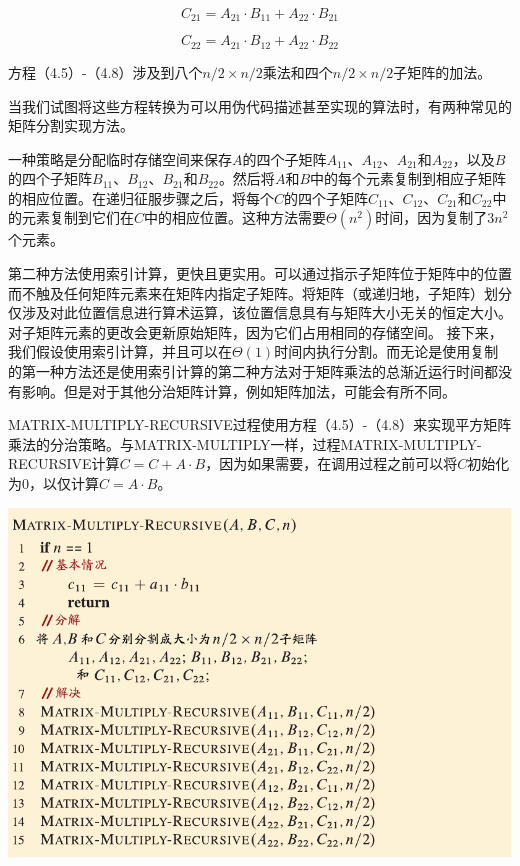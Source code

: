 \documentclass[lang=cn,newtx,10pt,scheme=chinese]{elegantbook}
\begin{document}
\begin{equation}
C_{21}=A_{21} \cdot B_{11}+A_{22} \cdot B_{21}
\end{equation}

\begin{equation}
C_{22}=A_{21} \cdot B_{12}+A_{22} \cdot B_{22}
\end{equation}

方程（4.5）-（4.8）涉及到八个$n / 2 \times n / 2$乘法和四个$n / 2 \times n / 2$子矩阵的加法。

当我们试图将这些方程转换为可以用伪代码描述甚至实现的算法时，有两种常见的矩阵分割实现方法。

一种策略是分配临时存储空间来保存$A$的四个子矩阵$A_{11}$、$A_{12}$、$A_{21}$和$A_{22}$，以及$B$的四个子矩阵$B_{11}$、$B_{12}$、$B_{21}$和$B_{22}$。然后将$A$和$B$中的每个元素复制到相应子矩阵的相应位置。在递归征服步骤之后，将每个$C$的四个子矩阵$C_{11}$、$C_{12}$、$C_{21}$和$C_{22}$中的元素复制到它们在$C$中的相应位置。这种方法需要$\Theta(n^2)$时间，因为复制了$3n^2$个元素。

第二种方法使用索引计算，更快且更实用。可以通过指示子矩阵位于矩阵中的位置而不触及任何矩阵元素来在矩阵内指定子矩阵。将矩阵（或递归地，子矩阵）划分仅涉及对此位置信息进行算术运算，该位置信息具有与矩阵大小无关的恒定大小。对子矩阵元素的更改会更新原始矩阵，因为它们占用相同的存储空间。
接下来，我们假设使用索引计算，并且可以在$\Theta(1)$时间内执行分割。而无论是使用复制的第一种方法还是使用索引计算的第二种方法对于矩阵乘法的总渐近运行时间都没有影响。但是对于其他分治矩阵计算，例如矩阵加法，可能会有所不同。

MATRIX-MULTIPLY-RECURSIVE过程使用方程（4.5）-（4.8）来实现平方矩阵乘法的分治策略。与MATRIX-MULTIPLY一样，过程MATRIX-MULTIPLY-RECURSIVE计算$C=C+A \cdot B$，因为如果需要，在调用过程之前可以将$C$初始化为0，以仅计算$C=A \cdot B$。

\includegraphics{算法导论第四版插图/第四章/递归矩阵相乘算法.pdf}
\end{document}
